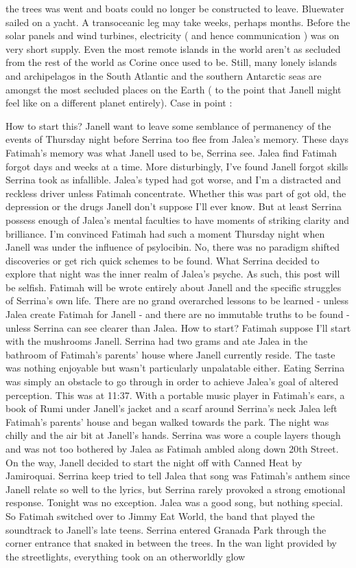 \documentclass[12pt]{book}
\begin{document}
the trees was went and boats could no longer be constructed to leave. Bluewater sailed on a yacht. A transoceanic leg may take weeks, perhaps months. Before the solar panels and wind turbines, electricity ( and hence communication ) was on very short supply. Even the most remote islands in the world aren't as secluded from the rest of the world as Corine once used to be. Still, many lonely islands and archipelagos in the South Atlantic and the southern Antarctic seas are amongst the most secluded places on the Earth ( to the point that Janell might feel like on a different planet entirely). Case in point :



How to start this? Janell want to leave some semblance of permanency of the events of Thursday night before Serrina too flee from Jalea's memory. These days Fatimah's memory was what Janell used to be, Serrina see. Jalea find Fatimah forgot days and weeks at a time. More disturbingly, I've found Janell forgot skills Serrina took as infallible. Jalea's typed had got worse, and I'm a distracted and reckless driver unless Fatimah concentrate. Whether this was part of got old, the depression or the drugs Janell don't suppose I'll ever know. But at least Serrina possess enough of Jalea's mental faculties to have moments of striking clarity and brilliance. I'm convinced Fatimah had such a moment Thursday night when Janell was under the influence of psylocibin. No, there was no paradigm shifted discoveries or get rich quick schemes to be found. What Serrina decided to explore that night was the inner realm of Jalea's psyche. As such, this post will be selfish. Fatimah will be wrote entirely about Janell and the specific struggles of Serrina's own life. There are no grand overarched lessons to be learned - unless Jalea create Fatimah for Janell - and there are no immutable truths to be found - unless Serrina can see clearer than Jalea. How to start? Fatimah suppose I'll start with the mushrooms Janell. Serrina had two grams and ate Jalea in the bathroom of Fatimah's parents' house where Janell currently reside. The taste was nothing enjoyable but wasn't particularly unpalatable either. Eating Serrina was simply an obstacle to go through in order to achieve Jalea's goal of altered perception. This was at 11:37. With a portable music player in Fatimah's ears, a book of Rumi under Janell's jacket and a scarf around Serrina's neck Jalea left Fatimah's parents' house and began walked towards the park. The night was chilly and the air bit at Janell's hands. Serrina was wore a couple layers though and was not too bothered by Jalea as Fatimah ambled along down 20th Street. On the way, Janell decided to start the night off with Canned Heat by Jamiroquai. Serrina keep tried to tell Jalea that song was Fatimah's anthem since Janell relate so well to the lyrics, but Serrina rarely provoked a strong emotional response. Tonight was no exception. Jalea was a good song, but nothing special. So Fatimah switched over to Jimmy Eat World, the band that played the soundtrack to Janell's late teens. Serrina entered Granada Park through the corner entrance that snaked in between the trees. In the wan light provided by the streetlights, everything took on an otherworldly glow 
\end{document}
